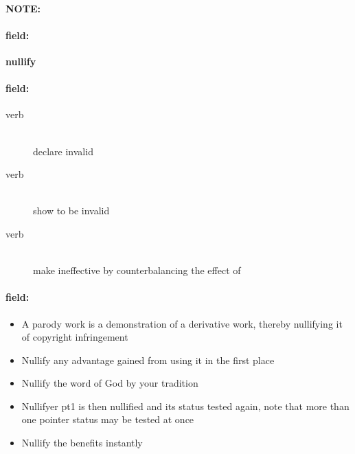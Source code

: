 \documentclass[12pt]{article}
\newenvironment{note}{\paragraph{NOTE:}}{}
\newenvironment{field}{\paragraph{field:}}{}
\begin{document}
\begin{note}
\begin{field}
\textbf{\large nullify}
\end{field}


\begin{field}
\begin{description}
\item[verb] \hfill \\ 
declare invalid

\item[verb] \hfill \\ 
show to be invalid

\item[verb] \hfill \\ 
make ineffective by counterbalancing the effect of

\end{description}
\end{field}

\begin{field}
\begin{itemize}
\item A parody work is a demonstration of a derivative work, thereby nullifying it of copyright infringement
\item Nullify any advantage gained from using it in the first place
\item Nullify the word of God by your tradition
\item Nullifyer pt1 is then nullified and its status tested again, note that more than one pointer status may be tested at once
\item Nullify the benefits instantly
\end{itemize}
\end{field}
\end{note}
\end{document}
